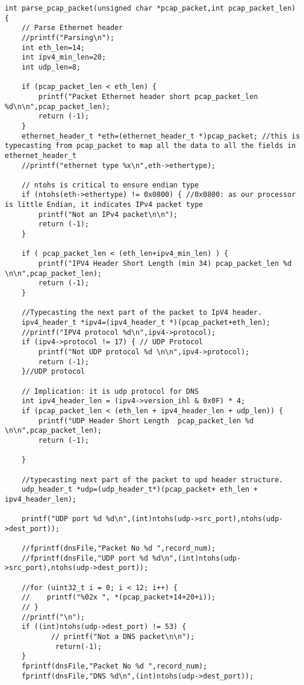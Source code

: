 \documentclass[12pt, a4paper]{report}
\begin{document}
\begin{lstlisting}[caption={Parsing through the packet.}]
int parse_pcap_packet(unsigned char *pcap_packet,int pcap_packet_len)
{
    // Parse Ethernet header
    //printf("Parsing\n");
    int eth_len=14;
    int ipv4_min_len=20;
    int udp_len=8;

    if (pcap_packet_len < eth_len) {
        printf("Packet Ethernet header short pcap_packet_len %d\n\n",pcap_packet_len);
        return (-1);
    }
    ethernet_header_t *eth=(ethernet_header_t *)pcap_packet; //this is typecasting from pcap_packet to map all the data to all the fields in ethernet_header_t
    //printf("ethernet type %x\n",eth->ethertype);

    // ntohs is critical to ensure endian type 
    if (ntohs(eth->ethertype) != 0x0800) { //0x0800: as our processor is little Endian, it indicates IPv4 packet type
        printf("Not an IPv4 packet\n\n");
        return (-1);
    }

    if ( pcap_packet_len < (eth_len+ipv4_min_len) ) {
        printf("IPV4 Header Short Length (min 34) pcap_packet_len %d \n\n",pcap_packet_len);
        return (-1);
    }

    //Typecasting the next part of the packet to IpV4 header.
    ipv4_header_t *ipv4=(ipv4_header_t *)(pcap_packet+eth_len);
    //printf("IPV4 protocol %d\n",ipv4->protocol);
    if (ipv4->protocol != 17) { // UDP Protocol
        printf("Not UDP protocol %d \n\n",ipv4->protocol);
        return (-1);
    }//UDP protocol

    // Implication: it is udp protocol for DNS
    int ipv4_header_len = (ipv4->version_ihl & 0x0F) * 4;
    if (pcap_packet_len < (eth_len + ipv4_header_len + udp_len)) {
        printf("UDP Header Short Length  pcap_packet_len %d \n\n",pcap_packet_len);
        return (-1);
    
    }

    //typecasting next part of the packet to upd header structure.
    udp_header_t *udp=(udp_header_t*)(pcap_packet+ eth_len + ipv4_header_len);
    
    printf("UDP port %d %d\n",(int)ntohs(udp->src_port),ntohs(udp->dest_port));

    //fprintf(dnsFile,"Packet No %d ",record_num);
    //fprintf(dnsFile,"UDP port %d %d\n",(int)ntohs(udp->src_port),ntohs(udp->dest_port));
    
    //for (uint32_t i = 0; i < 12; i++) {
    //    printf("%02x ", *(pcap_packet+14+20+i));
    // }
    //printf("\n");
    if ((int)ntohs(udp->dest_port) != 53) {
           // printf("Not a DNS packet\n\n");
            return(-1);
    }
    fprintf(dnsFile,"Packet No %d ",record_num);
    fprintf(dnsFile,"DNS %d\n",(int)ntohs(udp->dest_port));
    

\end{lstlisting}
\end{document}
